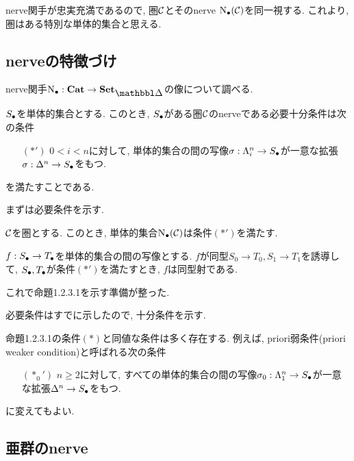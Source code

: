 \documentclass[uplatex, a4paper, 14Q, dvipdfmx]{jsreport}
\begin{document}
nerve関手が忠実充満であるので, 圏$\calC$とそのnerve $\N(\calC)$を同一視する. 
これより, 圏はある特別な単体的集合と思える. 

\subsection{nerveの特徴づけ}

nerve関手$\N: \cat \to \sset$の像について調べる. 

\begin{prop}
  $\S$を単体的集合とする. 
  このとき, $\S$がある圏$\calC$のnerveである必要十分条件は次の条件
  \begin{itemize}
    \item[$(\ast')$] $0<i<n$に対して, 単体的集合の間の写像$\si: \Lambda^n_i \to \S$が一意な拡張$\si: \Delta^n \to \S$をもつ.
  \end{itemize} 
  を満たすことである. 
\end{prop}

まずは必要条件を示す. 

\begin{lemma}
  $\calC$を圏とする. 
  このとき, 単体的集合$\N(\calC)$は条件$(\ast')$を満たす. 
\end{lemma}

\begin{lemma}
  $f: \S \to \T$を単体的集合の間の写像とする. 
  $f$が同型$S_0 \to T_0, S_1 \to T_1$を誘導して, $\S, \T$が条件$(\ast')$を満たすとき, $f$は同型射である. 
\end{lemma}

これで命題1.2.3.1を示す準備が整った. 

\begin{Proof}
  必要条件はすでに示したので, 十分条件を示す. 
\end{Proof}

\begin{remark}
  命題1.2.3.1の条件$(\ast)$と同値な条件は多く存在する. 
  例えば, priori弱条件(priori weaker condition)と呼ばれる次の条件
  \begin{itemize}
    \item[$(\ast_0')$] $n \geq 2$に対して, すべての単体的集合の間の写像$\si_0: \Lambda^n_1 \to \S$が一意な拡張$\Delta^n \to \S$をもつ.
  \end{itemize}
  に変えてもよい. 
\end{remark}

\subsection{亜群のnerve}
\end{document}

